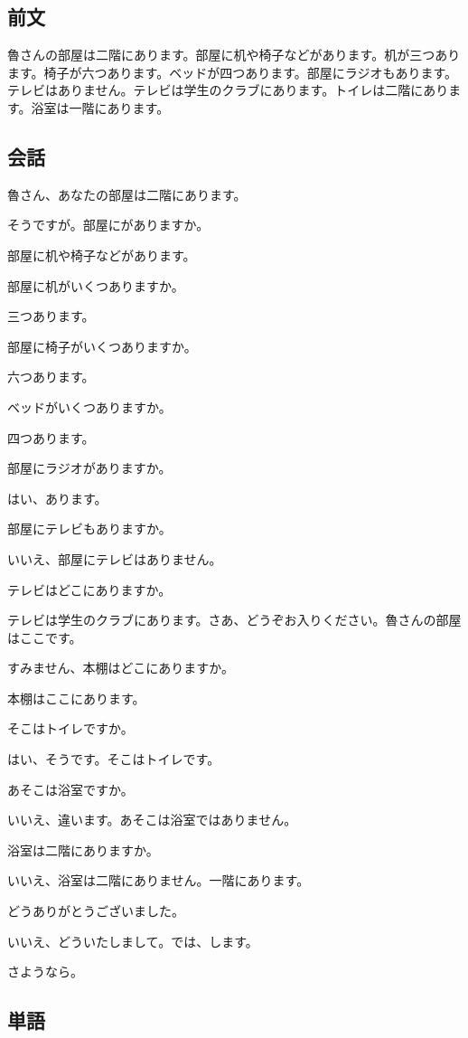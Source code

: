 \documentclass[a5j]{ltjtarticle}
\newcommand*{\Rospeaks}{\item[魯]}
\newcommand*{\Lispeaks}{\item[李]}
\begin{document}
\subsection*{前文}

魯さんの部屋は二階にあります。部屋に机や椅子などがあります。机が三つあります。椅子が六つあります。ベッドが四つあります。部屋にラジオもあります。テレビはありません。テレビは学生のクラブにあります。トイレは二階にあります。浴室は一階にあります。

\subsection*{会話}

\begin{dialogue}
  \Lispeaks 魯さん、あなたの部屋は二階にあります。
  \Rospeaks そうですが。部屋にがありますか。
  \Lispeaks 部屋に机や椅子などがあります。
  \Rospeaks 部屋に机がいくつありますか。
  \Lispeaks 三つあります。
  \Rospeaks 部屋に椅子がいくつありますか。
  \Lispeaks 六つあります。
  \Rospeaks ベッドがいくつありますか。
  \Lispeaks 四つあります。
  \Rospeaks 部屋にラジオがありますか。
  \Lispeaks はい、あります。
  \Rospeaks 部屋にテレビもありますか。
  \Lispeaks いいえ、部屋にテレビはありません。
  \Rospeaks テレビはどこにありますか。
  \Lispeaks テレビは学生のクラブにあります。さあ、どうぞお入りください。魯さんの部屋はここです。
  \Rospeaks すみません、本棚はどこにありますか。
  \Lispeaks 本棚はここにあります。
  \Rospeaks そこはトイレですか。
  \Lispeaks はい、そうです。そこはトイレです。
  \Rospeaks あそこは浴室ですか。
  \Lispeaks いいえ、違います。あそこは浴室ではありません。
  \Rospeaks 浴室は二階にありますか。
  \Lispeaks いいえ、浴室は二階にありません。一階にあります。
  \Rospeaks {}どうありがとうございました。
  \Lispeaks いいえ、どういたしまして。では、します。
  \Rospeaks さようなら。
\end{dialogue}

\subsection*{単語}
\end{document}
